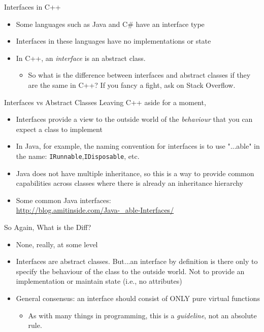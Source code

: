 \documentclass[10pt,xcolor={table,dvipsnames},t]{beamer}
\begin{document}
\begin{frame}[c]{Interfaces in C++}
\large
\begin{itemize}
	\item Some languages such as Java and C\# have an interface type
	\item Interfaces in these languages have no implementations or state
	\item In C++, an \textit{interface} is an abstract class.
    \begin{itemize}
	    \item So what is the difference between interfaces and abstract classes if they
	are the same in C++? If you fancy a fight, ask on Stack Overflow.
    \end{itemize}
\end{itemize}
\end{frame}

\begin{frame}[c]{Interfaces vs Abstract Classes}
\large
Leaving C++ aside for a moment,
\begin{itemize}
	\item Interfaces provide a view to the outside world of the \textit{behaviour} 
	that you can expect a class to implement
	\item In Java, for example, the naming convention for interfaces is to use "...able" in the name: \texttt{IRunnable},\texttt{IDisposable}, etc.
	\item Java does not have multiple inheritance, so this is a way to provide
	common capabilities across classes where there is already an inheritance
	hierarchy
	\item Some common Java interfaces:\\ \url{http://blog.amitinside.com/Java-_able-Interfaces/}
\end{itemize}

\end{frame}

\begin{frame}[c]{So Again, What is the Diff?}
\large
\begin{itemize}
	\item None, really, at some level
	\item Interfaces are abstract classes. But...an interface by definition
	is there only to specify the behaviour of the class to the outside world. Not
	to provide an implementation or maintain state (i.e., no attributes)
	\item General consensus: an interface should consist of ONLY pure virtual functions
	\begin{itemize}
	\item As with many things in programming, this is a \textit{guideline}, not
	an absolute rule.
\end{itemize}

\end{itemize}

\end{frame}
\end{document}
